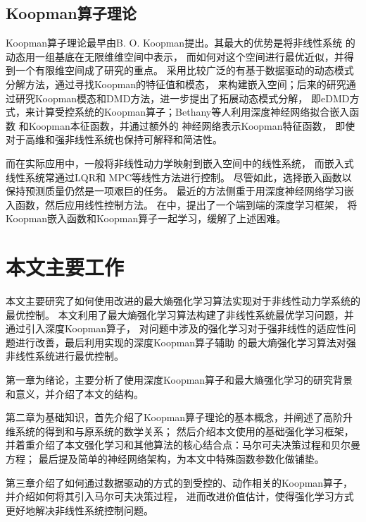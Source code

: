 \documentclass[AutoFakeBold]{LZUThesis}
\begin{document}
\subsection{Koopman算子理论}
Koopman算子理论最早由B. O. Koopman提出。其最大的优势是将非线性系统
的动态用一组基底在无限维维空间中表示，
而如何对这个空间进行最优近似，并得到一个有限维空间成了研究的重点。
采用比较广泛的有基于数据驱动的动态模式分解方法，通过寻找Koopman的特征值和模态，
来构建嵌入空间；后来的研究通过研究Koopman模态和DMD方法，进一步提出了拓展动态模式分解，
即eDMD方式，来计算受控系统的Koopman算子；Bethany等人\cite{lusch_deep_2018}利用深度神经网络拟合嵌入函数
和Koopman本征函数，并通过额外的
神经网络表示Koopman特征函数，
即使对于高维和强非线性系统也保持可解释和简洁性。

而在实际应用中，一般将非线性动力学映射到嵌入空间中的线性系统，
而嵌入式线性系统常通过LQR\cite{bemporad_explicit_2002}和
MPC\cite{fernandez-camacho_robust_1995}等线性方法进行控制。
尽管如此，选择嵌入函数以保持预测质量仍然是一项艰巨的任务。
最近的方法侧重于用深度神经网络\cite{mainuddin_detecting_2023}学习嵌入函数，然后应用线性控制方法\cite{han_deep_2020}。
在\cite{dkn}中，提出了一个端到端的深度学习框架，
将Koopman嵌入函数和Koopman算子一起学习，缓解了上述困难。

\section{本文主要工作}
本文主要研究了如何使用改进的最大熵强化学习算法实现对于非线性动力学系统的最优控制。
本文利用了最大熵强化学习算法构建了非线性系统最优学习问题，并通过引入深度Koopman算子，
对问题中涉及的强化学习对于强非线性的适应性问题进行改善，最后利用实现的深度Koopman算子辅助
的最大熵强化学习算法对强非线性系统进行最优控制。

第一章为绪论，主要分析了使用深度Koopman算子和最大熵强化学习的研究背景和意义，并介绍了本文的结构。

第二章为基础知识，首先介绍了Koopman算子理论的基本概念，并阐述了高阶升维系统的得到和与原系统的数学关系；
然后介绍本文使用的基础强化学习框架，并着重介绍了本文强化学习和其他算法的核心结合点：马尔可夫决策过程和贝尔曼方程；
最后提及简单的神经网络架构，为本文中特殊函数参数化做铺垫。

第三章介绍了如何通过数据驱动的方式的到受控的、动作相关的Koopman算子，并介绍如何将其引入马尔可夫决策过程，
进而改进价值估计，使得强化学习方式更好地解决非线性系统控制问题。
\end{document}
